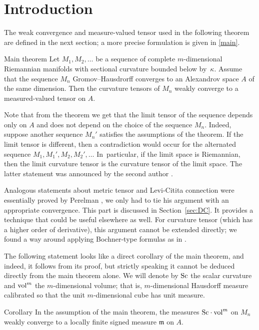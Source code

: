 \section{Introduction}

The weak convergence and measure-valued tensor used in the following theorem are defined in the next section;
a more precise formulation is given in \ref{main}.

\begin{thm}{Main theorem}
Let $M_1,M_2,\dots$ be a sequence of complete $m$-dimensional Riemannian manifolds with sectional curvature bounded below by~$\kappa$.
Assume that the sequence $M_n$ Gromov--Hausdrorff converges to an Alexandrov space $A$ of the same dimension.
Then the curvature tensors of $M_n$ weakly converge to a measured-valued tensor on $A$.
\end{thm}

Note that from the theorem we get that the limit tensor of the sequence depends only on $A$ and does not depend on the choice of the sequence $M_n$.
Indeed, suppose another sequence $M_n'$ satisfies the assumptions of the theorem.
If the limit tensor is different, 
then a contradiction would occur for the alternated sequence $M_1,M_1',M_2,M_2',\dots$ 
In~particular, if the limit space is Riemannian, then the limit curvature tensor is the curvature tensor of the limit space.
The latter statement was announced by the second author \cite{petrunin-poly}.

Analogous statements about metric tensor and Levi-Citita connection were essentially proved by Perelman \cite{PerDC},
we only had to tie his argument with an appropriate convergence.
This part is discussed in Section~\ref{sec:DC}. 
It provides a technique that could be useful elsewhere as well.
For curvature tensor (which has a higher order of derivative), this argument cannot be extended directly;
we found a way around applying Bochner-type formulas as in \cite{petrunin-SC}.

The following statement looks like a direct corollary of the main theorem, 
and indeed, it follows from its proof, but strictly speaking it cannot be deduced directly from the main theorem alone.
We will denote by $\operatorname{\rm Sc}$ the scalar curvature and $\operatorname{vol}^m$ the $m$-dimensional volume; that is, $m$-dimensional Hausdorff measure calibrated so that the unit $m$-dimensional cube has unit measure.

\begin{thm}{Corollary}\label{cor:Sc}
In the assumption of the main theorem,
the measures $\Sc\cdot \vol^m$ on $M_n$ weakly converge to a locally finite signed measure $\mathfrak m$  on $A$.
\end{thm}

